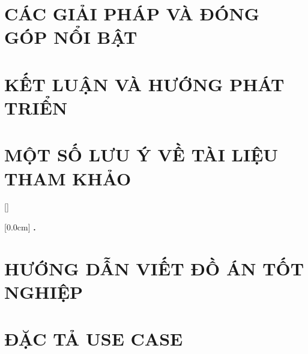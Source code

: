 \documentclass[a4paper,13pt,3p,twoside]{report}
\renewcommand{\bibname}{Danh_sach_tai_lieu_tham_khao}
\theoremstyle{definition}
\begin{document}
\newpage
\chapter{CÁC GIẢI PHÁP VÀ ĐÓNG GÓP NỔI BẬT}
\label{chapter:SolutionAndContribution}

\newpage
\chapter{KẾT LUẬN VÀ HƯỚNG PHÁT TRIỂN} %
\label{chapter:conclusion}


\newpage
\chapter*{MỘT SỐ LƯU Ý VỀ TÀI LIỆU THAM KHẢO} %
\label{chapter:reference}



\newpage
\renewcommand\bibname{TÀI LIỆU THAM KHẢO}
\printbibliography
{}

\appendixpage
\appendices
\addappheadtotoc


{}[]
\titlespacing*{\chapter}{0pt}{-20pt}{20pt}

    [0.0cm]             %
    {\bfseries\vspace{0.3cm}}                  %
    {{\bfseries{\scshape} \thecontentslabel.\ }} %
    {}         %
    {\contentspage}         %
\chapter{HƯỚNG DẪN VIẾT ĐỒ ÁN TỐT NGHIỆP}

\newpage
\chapter{ĐẶC TẢ USE CASE}

\end{document}
